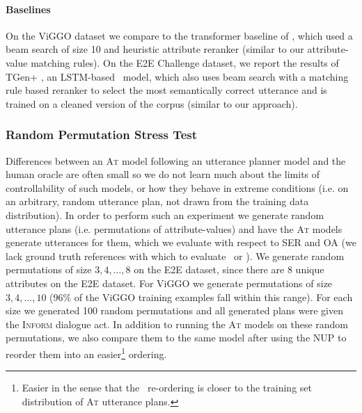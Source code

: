 \paragraph{Baselines} On the ViGGO dataset we compare to the transformer
baseline of \citet{juraska2019}, which used a beam search of size 10 and
heuristic attribute reranker (similar to our attribute-value matching rules).
On the E2E Challenge dataset, we report the results of 
TGen+ \cite{dusek2019}, an
LSTM-based \sequencetosequence~model, which also uses beam search with a matching rule based
reranker to select the most semantically correct utterance and is
trained on a cleaned version of the corpus (similar to our approach).
 
\subsubsection{Random Permutation Stress Test}



Differences between an \textsc{At} model following an utterance planner model
and the human oracle are often small so we do not learn much about the limits
of controllability of such models, or how they behave in extreme conditions
(i.e. on an arbitrary, random utterance plan, not drawn from the training data
distribution). In order to perform such an experiment we generate random
utterance plans (i.e. permutations of attribute-values) and have the
\textsc{At} models generate utterances for them, which we evaluate with
respect to SER and OA (we lack ground truth references with which to evaluate
\bleu~or \rougel).  We generate random permutations of size $3,4,\ldots, 8$ on
the E2E dataset, since there are 8 unique attributes on the E2E dataset. For
ViGGO we generate permutations of size $3,4,\ldots,10$ (96\% of the ViGGO
training examples fall within this range). For each size we generated 100
random permutations and all generated plans were given the \textsc{Inform}
dialogue act. In addition to running the \textsc{At} models on these random
permutations, we also compare them to the same model after using the NUP  to
reorder them into an easier\footnote{Easier in the sense that the
\NUP~re-ordering is closer to the training set distribution of \textsc{At}
utterance plans.} ordering. %



